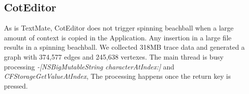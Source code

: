 \subsection{CotEditor}

As is TextMate, CotEditor does not trigger spinning beachball when a large
amount of context is copied in the Application.  Any insertion in a large file
results in a spinning beachball.  We collected 318MB trace data and generated a
graph with 374,577 edges and 245,638 vertexes.  The main thread is busy
processing \textit{-[NSBigMutableString characterAtIndex:]} and
\textit{CFStorageGetValueAtIndex}, The processing happens once the return key
is pressed.  
